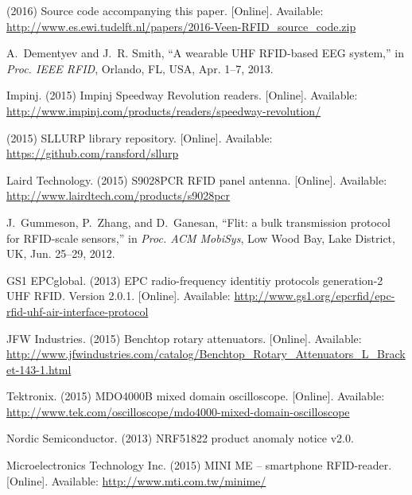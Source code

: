 \documentclass[conference,letterpaper,twoside,final,10pt]{IEEEtran}
\begin{document}
\begin{thebibliography}{10}
\BIBentryALTinterwordspacing
(2016) Source code accompanying this paper. [Online]. Available:
  \url{http://www.es.ewi.tudelft.nl/papers/2016-Veen-RFID_source_code.zip}
\BIBentrySTDinterwordspacing

A.~{Dementyev} and J.~R. {Smith}, ``A wearable {UHF} {RFID}-based {EEG}
  system,'' in \emph{Proc. {IEEE} {RFID}}, Orlando, FL, USA, Apr. 1--7, 2013.

\BIBentryALTinterwordspacing
Impinj. (2015) {Impinj} {Speedway} {Revolution} readers. [Online]. Available:
  \url{http://www.impinj.com/products/readers/speedway-revolution/}
\BIBentrySTDinterwordspacing

\BIBentryALTinterwordspacing
(2015) {SLLURP} library repository. [Online]. Available:
  \url{https://github.com/ransford/sllurp}
\BIBentrySTDinterwordspacing

\BIBentryALTinterwordspacing
{Laird Technology}. (2015) {S9028PCR} {RFID} panel antenna. [Online].
  Available: \url{http://www.lairdtech.com/products/s9028pcr}
\BIBentrySTDinterwordspacing

J.~{Gummeson}, P.~{Zhang}, and D.~{Ganesan}, ``Flit: a bulk transmission
  protocol for {RFID}-scale sensors,'' in \emph{Proc. {ACM} {MobiSys}}, Low
  Wood Bay, Lake District, UK, Jun. 25--29, 2012.

\BIBentryALTinterwordspacing
{GS1 EPCglobal}. (2013) {EPC} radio-frequency identitiy protocols generation-2
  {UHF} {RFID}. Version 2.0.1. [Online]. Available:
  \url{http://www.gs1.org/epcrfid/epc-rfid-uhf-air-interface-protocol}
\BIBentrySTDinterwordspacing

\BIBentryALTinterwordspacing
{JFW Industries}. (2015) Benchtop rotary attenuators. [Online]. Available:
  \url{http://www.jfwindustries.com/catalog/Benchtop_Rotary_Attenuators_L_Bracket-143-1.html}
\BIBentrySTDinterwordspacing

\BIBentryALTinterwordspacing
{Tektronix}. (2015) {MDO4000B} mixed domain oscilloscope. [Online]. Available:
  \url{http://www.tek.com/oscilloscope/mdo4000-mixed-domain-oscilloscope}
\BIBentrySTDinterwordspacing

{Nordic Semiconductor}. (2013) {NRF51822} product anomaly notice v2.0.

\BIBentryALTinterwordspacing
{Microelectronics Technology Inc.} (2015) {MINI ME} -- smartphone
  {RFID}-reader. [Online]. Available: \url{http://www.mti.com.tw/minime/}
\BIBentrySTDinterwordspacing


\end{thebibliography}
\end{document}
